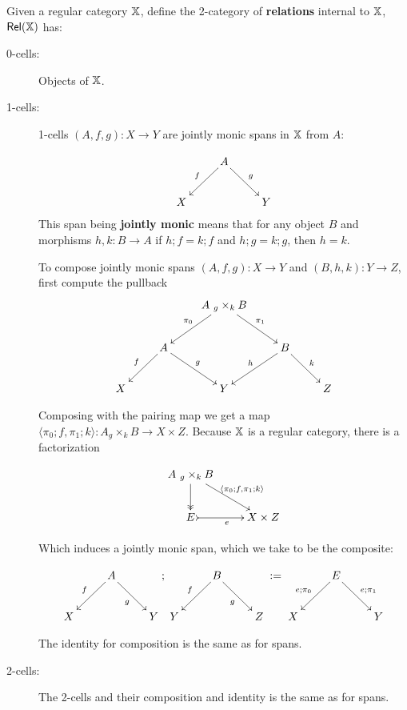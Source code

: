 \begin{definition}
Given a regular category $\mathbb{X}$, define the 2-category of {\bf relations} internal to $\mathbb{X}$, $\mathsf{Rel}(\mathbb{X})$ has:

\begin{description}
\item[0-cells:] Objects of $\mathbb{X}$.
\item[1-cells:] 1-cells $(A,f,g):X\to Y$ are jointly monic spans in $\mathbb{X}$ from $A$:


$$
\xymatrix{
    & A \ar[dl]_{f} \ar[dr]^{g}
    &
  \\X 
    &
    & Y
}
$$
This span being {\bf jointly monic} means that for any object $B$ and morphisms $h,k:B\to A$ if $h;f=k;f$ and $h;g=k;g$, then $h=k$.

To compose jointly monic spans $(A,f,g):X\to Y$ and $(B,h,k):Y\to Z$,  first compute the pullback
$$
\xymatrix{
    &
    & A\ {}_g\times_k B \ar[dl]_{\pi_0} \ar[dr]^{\pi_1}
    &
    &
  \\
    & A \ar[dl]_{f} \ar[dr]^{g}
    &
    & B \ar[dl]_{h} \ar[dr]^{k}
    &
  \\X
    &
    & Y
    &
    & Z
}
$$

Composing with the pairing map we get a map $\langle \pi_0;f,\pi_1;k\rangle :A {}_g\times_k B \to X\times Z$.
Because $\mathbb{X}$ is a regular category, there is a factorization 

$$
\xymatrix{
  A\ {}_g\times_k B \ar[dr]^{\langle \pi_0;f,\pi_1;k\rangle}  \ar@{->>}[d]
  \\ E \ar@{>->}[r]_{e}
    &  X\times Z
}
$$

Which induces a jointly monic span, which we take to be the composite:

$$
\xymatrix{
    & A \ar[dl]_{f} \ar[dr]_{g}
    &
  \\X 
    &
    & Y
};
\xymatrix{
    & B \ar[dl]_{f} \ar[dr]_{g}
    &
  \\Y 
    &
    & Z
}
:=
\xymatrix{
    & E \ar[dl]_{e;\pi_0} \ar[dr]^{e;\pi_1}
    &
  \\X 
    &
    & Y
}
$$

The identity for composition is the same as for spans.

\item[2-cells:] The 2-cells and their composition and identity is the same as for spans.

\end{description}

\end{definition}

